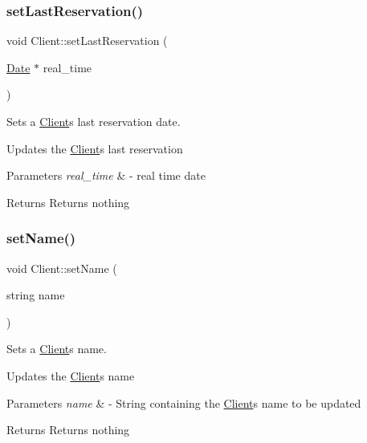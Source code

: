 \subsubsection{\texorpdfstring{set\+Last\+Reservation()}{setLastReservation()}}
{\footnotesize\ttfamily void Client\+::set\+Last\+Reservation (\begin{DoxyParamCaption}\item[{\hyperlink{class_date}{Date} $\ast$}]{real\+\_\+time }\end{DoxyParamCaption})}



Sets a \hyperlink{class_client}{Client}\textquotesingle{}s last reservation date. 

Updates the \hyperlink{class_client}{Client}\textquotesingle{}s last reservation


\begin{DoxyParams}{Parameters}
{\em real\+\_\+time} & -\/ real time date \\
\hline
\end{DoxyParams}
\begin{DoxyReturn}{Returns}
Returns nothing 
\end{DoxyReturn}
\mbox{\label{class_client_a1c7f938360e23b3e0e52d17965f88725}} 
\subsubsection{\texorpdfstring{set\+Name()}{setName()}}
{\footnotesize\ttfamily void Client\+::set\+Name (\begin{DoxyParamCaption}\item[{string}]{name }\end{DoxyParamCaption})}



Sets a \hyperlink{class_client}{Client}\textquotesingle{}s name. 

Updates the \hyperlink{class_client}{Client}\textquotesingle{}s name


\begin{DoxyParams}{Parameters}
{\em name} & -\/ String containing the \hyperlink{class_client}{Client}\textquotesingle{}s name to be updated \\
\hline
\end{DoxyParams}
\begin{DoxyReturn}{Returns}
Returns nothing 
\end{DoxyReturn}
\mbox{\label{class_client_a8d0ab1a3c654d361dacde7e1d2b92c94}} 
